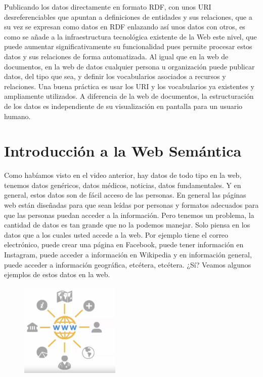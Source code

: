 Publicando los datos directamente en formato RDF, con unos URI desreferenciables que apuntan a definiciones de entidades y sus relaciones, que a su vez se expresan como datos en RDF enlazando así unos datos con otros, es como se añade a la infraestructura tecnológica existente de la Web este nivel, que puede aumentar significativamente su funcionalidad pues permite procesar estos datos y sus relaciones de forma automatizada. Al igual que en la web de documentos, en la web de datos cualquier persona u organización puede publicar datos, del tipo que sea, y definir los vocabularios asociados a recursos y relaciones. Una buena práctica es usar los URI y los vocabularios ya existentes y ampliamente utilizados. A diferencia de la web de documentos, la estructuración de los datos es independiente de su visualización en pantalla para un usuario humano.


\section{Introducción a la Web Semántica}


Como habíamos visto en el video anterior, hay datos de todo tipo en la web, tenemos datos genéricos, datos médicos, noticias, datos fundamentales. Y en general, estos datos son de fácil acceso de las personas. En general las páginas web están diseñadas para que sean leídas por personas y formatos adecuados para que las personas puedan acceder a la información. Pero tenemos un problema, la cantidad de datos es tan grande que no la podemos manejar. Solo piensa en los datos que a los cuales usted accede a la web. Por ejemplo tiene el correo electrónico, puede crear una página en Facebook, puede tener información en Instagram, puede acceder a información en Wikipedia y en información general, puede acceder a información geográfica, etcétera, etcétera. ¿Sí? Veamos algunos ejemplos de estos datos en la web. 

 \begin{figure}[H]
	\centering
	\includegraphics[height=4.5cm]{imagenes/capitulo3/4}
	\caption{}
\end{figure}

